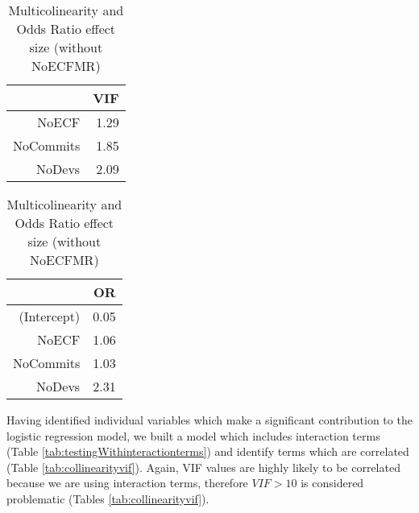 \documentclass[times]{smrauth}
\begin{document}
\begin{table}[tbp]
\centering
\caption{Multicolinearity and Odds Ratio effect size (without NoECFMR)} 
\label{tab:multicolinearitywithoutsum}
\begin{tabular}{rr}
  \hline
 & VIF \\ 
  \hline
NoECF & 1.29 \\ 
  NoCommits & 1.85 \\ 
  NoDevs & 2.09 \\ 
   \hline
\end{tabular}
\quad
\quad
\quad
\begin{tabular}{rr}
  \hline
 & OR \\ 
  \hline
(Intercept) & 0.05 \\ 
  NoECF & 1.06 \\ 
  NoCommits & 1.03 \\ 
  NoDevs & 2.31 \\ 
   \hline
\end{tabular}
\end{table}





Having identified individual variables which make a significant contribution to the logistic regression model, we built a model which includes interaction terms (Table \ref{tab:testingWithinteractionterms}) and identify terms which are correlated (Table \ref{tab:collinearityvif}). Again, VIF values are highly likely to be correlated because we are using interaction terms, therefore $VIF > 10$ is considered problematic (Tables \ref{tab:collinearityvif}).
\end{document}
